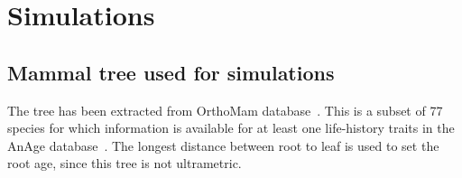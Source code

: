 \documentclass{article}
\begin{document}
	\section{Simulations}
	\label{sec:supp-mat-simulations}

	\subsection{Mammal tree used for simulations}

	
	The tree has been extracted from OrthoMam database~\citep{Ranwez2007,Scornavacca2019}.
	This is a subset of 77 species for which information is available for at least one life-history traits in the AnAge database~\citep{DEMAGALHAES2009,Tacutu2012}.
	The longest distance between root to leaf is used to set the root age, since this tree is not ultrametric.
	
\end{document}
